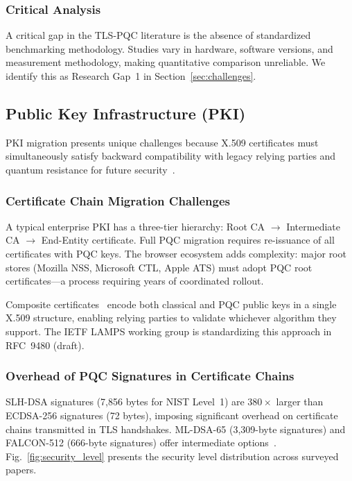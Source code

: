 \documentclass[journal]{IEEEtran}
\begin{document}
\subsubsection{Critical Analysis}

A critical gap in the TLS-PQC literature is the absence of standardized
benchmarking methodology. Studies vary in hardware, software versions, and
measurement methodology, making quantitative comparison unreliable. We identify
this as Research Gap~1 in Section~\ref{sec:challenges}.

\subsection{Public Key Infrastructure (PKI)}
\label{sec:pki}

PKI migration presents unique challenges because X.509 certificates must
simultaneously satisfy backward compatibility with legacy relying parties
and quantum resistance for future security~\cite{ott2019identifying}.

\subsubsection{Certificate Chain Migration Challenges}

A typical enterprise PKI has a three-tier hierarchy: Root CA $\to$ Intermediate
CA $\to$ End-Entity certificate. Full PQC migration requires re-issuance of
all certificates with PQC keys. The browser ecosystem adds complexity: major
root stores (Mozilla NSS, Microsoft CTL, Apple ATS) must adopt PQC root
certificates---a process requiring years of coordinated rollout.

Composite certificates~\cite{bindel2017hybrid} encode both classical and PQC
public keys in a single X.509 structure, enabling relying parties to validate
whichever algorithm they support. The IETF LAMPS working group is standardizing
this approach in RFC~9480 (draft).

\subsubsection{Overhead of PQC Signatures in Certificate Chains}

SLH-DSA signatures (7,856 bytes for NIST Level~1) are $380\times$ larger
than ECDSA-256 signatures (72 bytes), imposing significant overhead on
certificate chains transmitted in TLS handshakes. ML-DSA-65 (3,309-byte
signatures) and FALCON-512 (666-byte signatures) offer intermediate
options~\cite{kampanakis2021pki}. Fig.~\ref{fig:security_level} presents
the security level distribution across surveyed papers.
\end{document}
